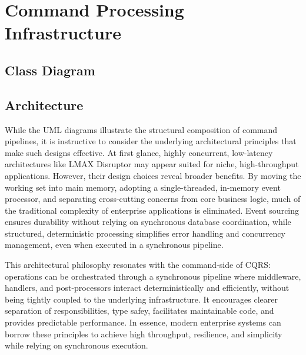 \section{Command Processing Infrastructure}
\subsection{Class Diagram}


\subsection{Architecture}
While the UML diagrams  illustrate the structural composition of command pipelines, it is instructive to consider the underlying architectural principles that make such designs effective. At first glance, highly concurrent, low-latency architectures like LMAX Disruptor  may appear suited for niche, high-throughput applications. However, their design choices reveal broader benefits. By moving the working set into main memory, adopting a single-threaded, in-memory event processor, and separating cross-cutting concerns from core business logic, much of the traditional complexity of enterprise applications is eliminated. Event sourcing ensures durability without relying on synchronous database coordination, while structured, deterministic processing  simplifies error handling and concurrency management, even when executed in a synchronous pipeline. 

This architectural philosophy  resonates with the command-side of CQRS: operations can be orchestrated through a synchronous pipeline where middleware, handlers, and post-processors interact deterministically and efficiently, without being tightly coupled to the underlying infrastructure. It encourages clearer separation of responsibilities, type safey, facilitates maintainable code, and provides predictable performance. In essence, modern enterprise systems can borrow these principles  to achieve high throughput, resilience, and simplicity while relying on synchronous execution.

